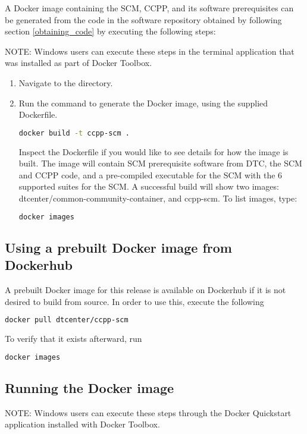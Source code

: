 A Docker image containing the SCM, CCPP, and its software prerequisites can be generated from the code in the software repository obtained by following section \ref{obtaining_code} by executing the following steps:

NOTE: Windows users can execute these steps in the terminal application that was installed as part of Docker Toolbox.

\begin{enumerate}
\item Navigate to the  directory.
\item Run the  command to generate the Docker image, using the supplied Dockerfile.
\begin{lstlisting}[language=bash]
docker build -t ccpp-scm .
\end{lstlisting}
Inspect the Dockerfile if you would like to see details for how the image is built. The image will contain SCM prerequisite software from DTC, the SCM and CCPP code, and a pre-compiled executable for the SCM with the 6 supported suites for the SCM. A successful build will show two images: dtcenter/common-community-container, and ccpp-scm. To list images, type:
\begin{lstlisting}[language=bash]
docker images
\end{lstlisting}
\end{enumerate}

\subsection{Using a prebuilt Docker image from Dockerhub}

A prebuilt Docker image for this release is available on Dockerhub if it is not desired to build from source. In order to use this, execute the following
\begin{lstlisting}[language=bash]
docker pull dtcenter/ccpp-scm
\end{lstlisting}
To verify that it exists afterward, run
\begin{lstlisting}[language=bash]
docker images
\end{lstlisting}

\subsection{Running the Docker image}

NOTE: Windows users can execute these steps through the Docker Quickstart application installed with Docker Toolbox.

